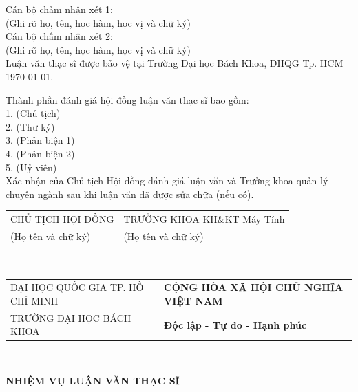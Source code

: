 \documentclass[a4paper, 13pt]{report}
\begin{document}
\vspace*{4cm}Cán bộ chấm nhận xét 1: 	\\
	(Ghi rõ họ, tên, học hàm, học vị và chữ  ký)\\

\vspace*{4cm}Cán bộ chấm nhận xét 2:	\\
	(Ghi rõ họ, tên, học hàm, học vị và chữ  ký)\\

\vspace*{4cm}Luận văn thạc sĩ được bảo vệ tại Trường Đại học Bách Khoa, ĐHQG Tp. HCM \\
\today.

\vspace*{0.5cm}Thành phần đánh giá hội đồng luận văn thạc sĩ bao gồm: \\
1.  (Chủ tịch)\\
2.  (Thư ký)	\\
3.  (Phản biện 1)\\
4.  (Phản biện 2)\\
5.  (Uỷ viên)\\
Xác nhận của Chủ tịch Hội đồng đánh giá luận văn và Trưởng khoa quản lý chuyên ngành sau khi luận văn đã được sửa chữa (nếu có).\\
\begin{tabular}{ p{7cm}p{9cm}}
 \hspace{1cm} CHỦ TỊCH HỘI ĐỒNG & TRƯỞNG KHOA KH$\&$KT Máy Tính\\
 \hspace{1cm}  (Họ tên và chữ ký) & (Họ tên và chữ ký)\\
\end{tabular}\\
\pagebreak
\begin{tabular}{ p{7cm}p{9cm}}
 ĐẠI HỌC QUỐC GIA TP. HỒ CHÍ MINH & \textbf{CỘNG HÒA XÃ HỘI CHỦ NGHĨA VIỆT NAM}\\
 \hspace{0.5cm}TRƯỜNG ĐẠI HỌC BÁCH KHOA & \hspace{2cm}\textbf{Độc lập - Tự do - Hạnh phúc}\\
\end{tabular}\\
\vspace*{1cm}
\begin{center}{\fontsize{16pt}{1}\selectfont \textbf{NHIỆM VỤ LUẬN VĂN THẠC SĨ}}\\\end{center}
\end{document}
